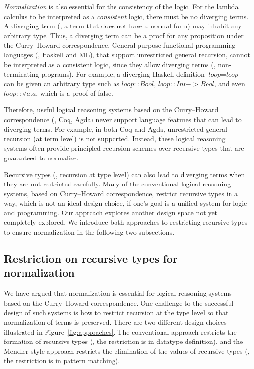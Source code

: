 \emph{Normalization} is also essential for the consistency of the logic.
For the lambda calculus to be interpreted as a \emph{consistent} logic,
there must be no diverging terms. A diverging term (\ie, a term that does
not have a normal form) may inhabit any arbitrary type. Thus, a diverging term
can be a proof for any proposition under the Curry--Howard correspondence.
General purpose functional programming languages (\eg, Haskell and ML), that
support unrestricted general recursion, cannot be interpreted as a consistent
logic, since they allow diverging terms (\ie, non-terminating programs).
For example, a diverging Haskell definition $\textit{loop} = \textit{loop}$
can be given an arbitrary type such as
$\textit{loop}\mathrel{::}\textit{Bool}$,
$\textit{loop}\mathrel{::}\textit{Int} -> \textit{Bool}$,
and even $\textit{loop}\mathrel{::}\forall a. a$, which is a proof of false.


Therefore, useful logical reasoning systems based on the Curry--Howard
correspondence (\eg, Coq, Agda) never support language features that can
lead to diverging terms. For example, in both Coq and Agda,
unrestricted general recursion (at term level) is not supported. 
Instead, these logical reasoning systems
often provide principled recursion schemes over recursive types that are
guaranteed to normalize. 

Recursive types (\ie, recursion at type level)
can also lead to diverging terms when they are not restricted carefully.
Many of the conventional logical reasoning systems, based on
Curry--Howard correspondence, restrict recursive types in a way,
which is not an ideal design choice, if one's goal is a unified system for
logic and programming. Our approach explores another design space not yet
completely explored. We introduce both approaches to restricting recursive
types to ensure normalization in the following two subsections.


\subsection{Restriction on recursive types for normalization}
\label{sec:intro:concpets:recursive}
We have argued that normalization is essential for logical reasoning systems
based on the Curry--Howard correspondence. One challenge to the successful
design of such systems is how to restrict recursion at the type level
so that normalization of terms is preserved. 
There are two different
design choices illustrated in Figure~\ref{fig:approaches}. 
The conventional approach restricts the formation
of recursive types (\ie, the restriction is in datatype definition), and
the Mendler-style approach restricts the elimination
of the values of recursive types (\ie, the restriction is in pattern matching).


